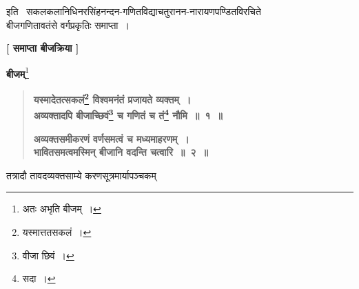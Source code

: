 \documentclass[11pt, openany]{book}
\begin{document}
इति ~सकलकलानिधिनरसिंहनन्दन-गणितविद्याचतुरानन-नारायणपण्डितविरचिते\\
बीजगणितावतंसे वर्गप्रकृतिः समाप्ता~। 
\vspace{4mm}

\begin{center}
\textbf{[ समाप्ता बीजक्रिया ]}
\end{center}
\vspace{40mm}

\newpage

\thispagestyle{empty}

 \label{bij}
\begin{center}
{\Large \textbf{बीजम्}}\renewcommand{\thefootnote}{१}\footnote{अतः अभृति बीजम्~।}
\end{center}

\begin{quote}
 \label{1b}
\textbf{{\color{purple}यस्मादेतत्सकलं\renewcommand{\thefootnote}{२}\footnote{यस्मात्ततसकलं~।} विश्वमनंतं प्रजायते व्यक्तम्~। \\
अव्यक्तादपि बीजाच्छिवं\renewcommand{\thefootnote}{३}\footnote{वीजा छिवं~।} च गणितं च तं\renewcommand{\thefootnote}{४}\footnote{सदा~।} नौमि~॥~१~॥}}
\vspace{1mm}

 \label{2b}
\textbf{{\color{purple}अव्यक्तसमीकरणं वर्णसमत्वं च मध्यमाहरणम्~। \\
भावितसमत्वमस्मिन् बीजानि वदन्ति चत्वारि~॥~२~॥}}
\end{quote}

 \label{3b}
तत्रादौ तावदव्यक्तसाम्ये करणसूत्रमार्यापञ्चकम् \textendash 
\end{document}
